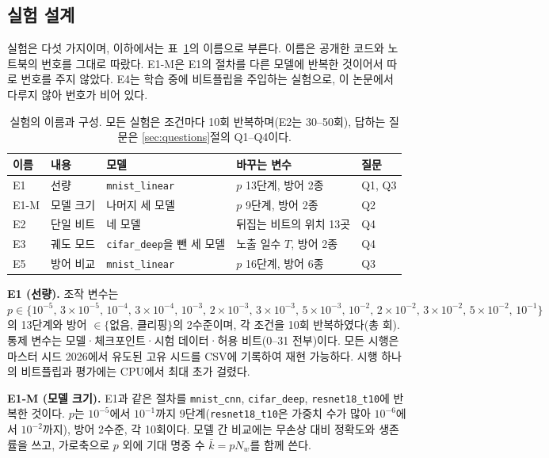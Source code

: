 \documentclass[11pt,a4paper]{article}
\newcommand{\code}[1]{\texttt{#1}}
\begin{document}
\subsection{실험 설계}
\label{sec:design}
실험은 다섯 가지이며, 이하에서는 표~\ref{tab:exps}의 이름으로 부른다. 이름은 공개한 코드와 노트북의 번호를 그대로 따랐다. E1-M은 E1의 절차를 다른 모델에 반복한 것이어서 따로 번호를 주지 않았다. E4는 학습 중에 비트플립을 주입하는 실험으로, 이 논문에서 다루지 않아 번호가 비어 있다.

\begin{table}[H]
  \centering\small
  \caption{실험의 이름과 구성. 모든 실험은 조건마다 10회 반복하며(E2는 30--50회), 답하는 질문은 \ref{sec:questions}절의 Q1--Q4이다.}
  \label{tab:exps}
  \begin{tabular}{lllll}
    \toprule
    이름 & 내용 & 모델 & 바꾸는 변수 & 질문 \\
    \midrule
    E1 & 선량 & \code{mnist\_linear} & $p$ 13단계, 방어 2종 & Q1, Q3 \\
    E1-M & 모델 크기 & 나머지 세 모델 & $p$ 9단계, 방어 2종 & Q2 \\
    E2 & 단일 비트 & 네 모델 & 뒤집는 비트의 위치 13곳 & Q4 \\
    E3 & 궤도 모드 & \code{cifar\_deep}을 뺀 세 모델 & 노출 일수 $T$, 방어 2종 & Q4 \\
    E5 & 방어 비교 & \code{mnist\_linear} & $p$ 16단계, 방어 6종 & Q3 \\
    \bottomrule
  \end{tabular}
\end{table}

\textbf{E1 (선량).} 조작 변수는 $p\in\{10^{-5},\,3\times10^{-5},\,10^{-4},\,3\times10^{-4},\,10^{-3},\,2\times10^{-3},\,3\times10^{-3},\,5\times10^{-3},\,10^{-2},\,2\times10^{-2},\,3\times10^{-2},\,5\times10^{-2},\,10^{-1}\}$의 13단계와 방어 $\in\{$없음, 클리핑$\}$의 2수준이며, 각 조건을 10회 반복하였다(총 \NumTrials{}회). 통제 변수는 모델·체크포인트·시험 데이터·허용 비트(0--31 전부)이다. 모든 시행은 마스터 시드 2026에서 유도된 고유 시드를 CSV에 기록하여 재현 가능하다. 시행 하나의 비트플립과 평가에는 CPU에서 최대 \MaxSeconds{}초가 걸렸다.

\textbf{E1-M (모델 크기).} E1과 같은 절차를 \code{mnist\_cnn}, \code{cifar\_deep}, \code{resnet18\_t10}에 반복한 것이다. $p$는 $10^{-5}$에서 $10^{-1}$까지 9단계(\code{resnet18\_t10}은 가중치 수가 많아 $10^{-6}$에서 $10^{-2}$까지), 방어 2수준, 각 10회이다. 모델 간 비교에는 무손상 대비 정확도와 생존률을 쓰고, 가로축으로 $p$ 외에 기대 명중 수 $\bar{k}=pN_w$를 함께 쓴다.
\end{document}

